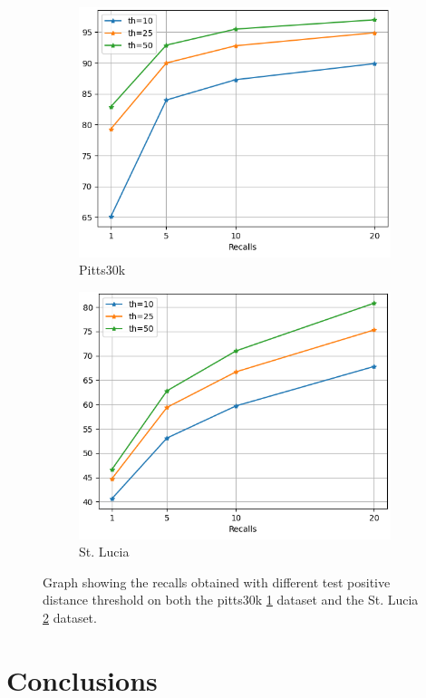 \documentclass[10pt,twocolumn,letterpaper]{article}
\begin{document}
\begin{figure}
   \centering
   \begin{subfigure}[b]{0.23\textwidth}
      \centering
      \includegraphics[width=\textwidth]{img/test_th/test_pitts30k_recalls_graph.png}
      \caption{Pitts30k}
      \label{fig:recalls:test_th:pitts30k}
   \end{subfigure}
   \hfill
   \begin{subfigure}[b]{0.23\textwidth}
      \centering
      \includegraphics[width=\textwidth]{img/test_th/test_st_lucia_recalls_graph.png}
      \caption{St. Lucia}
      \label{fig:recalls:test_th:st_lucia}
   \end{subfigure}
   \caption{Graph showing the recalls obtained with different test positive distance threshold on both the pitts30k \ref{fig:recalls:test_th:pitts30k} dataset and the St. Lucia \ref{fig:recalls:test_th:st_lucia} dataset.}
   \label{fig:recalls:test_th}
\end{figure}

\section{Conclusions}

{\small


}
\end{document}
